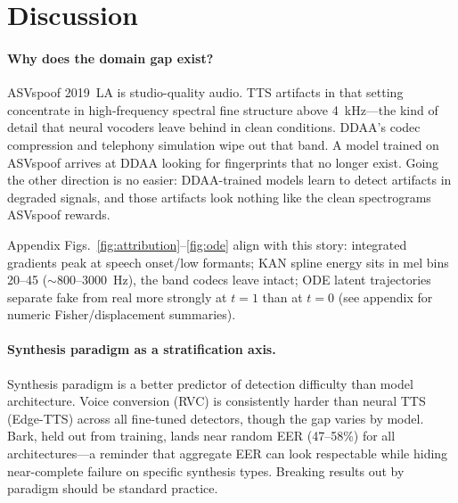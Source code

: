 \documentclass{article}
\newcommand{\ddaa}{\textsc{DDAA}}
\begin{document}
\section{Discussion}
\label{sec:discussion}

\paragraph{Why does the domain gap exist?}
ASVspoof 2019~LA is studio-quality audio.  TTS artifacts in that setting
concentrate in high-frequency spectral fine structure above 4~kHz---the kind
of detail that neural vocoders leave behind in clean conditions.  \ddaa's
codec compression and telephony simulation wipe out that band.  A model
trained on ASVspoof arrives at \ddaa{} looking for fingerprints that no longer
exist.  Going the other direction is no easier: \ddaa-trained models learn to
detect artifacts in degraded signals, and those artifacts look nothing like the
clean spectrograms ASVspoof rewards.

Appendix Figs.~\ref{fig:attribution}--\ref{fig:ode} align with this story:
integrated gradients peak at speech onset/low formants; KAN spline energy sits in
mel bins 20--45 ($\sim$800--3000~Hz), the band codecs leave intact; ODE latent
trajectories separate fake from real more strongly at $t{=}1$ than at $t{=}0$
(see appendix for numeric Fisher/displacement summaries).

\paragraph{Synthesis paradigm as a stratification axis.}
Synthesis paradigm is a better predictor of detection difficulty than model
architecture.  Voice conversion (RVC) is consistently harder than neural TTS
(Edge-TTS) across all fine-tuned detectors, though the gap varies by model.
Bark, held out from training, lands near random EER (47--58\%) for all
architectures---a reminder that aggregate EER can look respectable while
hiding near-complete failure on specific synthesis types.  Breaking results
out by paradigm should be standard practice.
\end{document}
